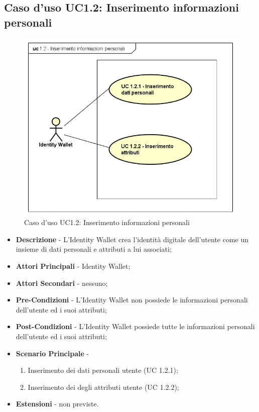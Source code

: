 \subsection{Caso d'uso UC1.2: Inserimento informazioni personali}
\begin{figure}[h]
	\centering
	\includegraphics[scale=0.50]{immagini/usecase/UC12_InserimentoInformazioniPersonalii}
	\caption{Caso d'uso UC1.2: Inserimento informazioni personali}
\end{figure}
\begin{itemize}
	\item \textbf{Descrizione} - L'Identity Wallet crea l'identità digitale dell'utente come un insieme di dati personali e attributi a lui associati;
	\item \textbf{Attori Principali} - Identity Wallet;
	\item \textbf{Attori Secondari} - nessuno;
	\item \textbf{Pre-Condizioni} - L'Identity Wallet non possiede le informazioni personali dell'utente ed i suoi attributi;
	\item \textbf{Post-Condizioni} - L'Identity Wallet possiede tutte le informazioni personali dell'utente ed i suoi attributi;
	\item \textbf{Scenario Principale} -
	\begin{enumerate}
		\item Inserimento dei dati personali utente (UC 1.2.1);
		\item Inserimento dei degli attributi utente (UC 1.2.2);
	\end{enumerate}
	\item \textbf{Estensioni} - non previste.
\end{itemize}
\newpage
